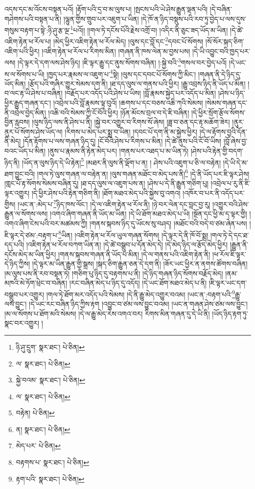 འདས་དང་མ་འོངས་བསྟན་པའོ། །རྟོག་པའི་དྲ་བ་མ་ལུས་པ། །སྤངས་པའི་ཡེ་ཤེས་རྒྱུན་ལྡན་པའི། །དེ་བཞིན་གཤེགས་པའི་བསྟན་པ་ནི། །ལྷུན་གྱིས་གྲུབ་པར་འཇུག་པ་ཡིན། །དེ་ཁོ་ན་ཉིད་བསྡུས་པའི་རབ་ཏུ་བྱེད་པ་ལས་དུས་གསུམ་བརྟག་པ་སྟེ་:ཉི་ཤུ་རྩ་ལྔ་\footnote{ཉི་ཤུ་དྲུག་  སྣར་ཐང་།  པེ་ཅིན། }པའོ།། །།གལ་ཏེ་དངོས་པོའི་རྗེས་འགྲོ་བ། །འདིར་ནི་ཅུང་ཟད་ཡོད་མ་ཡིན། །དེ་ཚེ་འཇིག་རྟེན་ཕ་རོལ་པ། །མེད་ཕྱིར་འཇིག་རྟེན་ཕ་རོལ་མེད། །ལུས་དང་བློ་དང་\footnote{ལ་  སྣར་ཐང་།  པེ་ཅིན། }དབང་པོ་སོགས། །སོ་སོར་སྐད་ཅིག་འཇིག་པའི་ཕྱིར། །འཇིག་རྟེན་ཕ་རོལ་པ་རིགས་མིན། །གཞན་ནི་ཁས་ལེན་མ་བྱས་པས། །དེ་ཡི་འབྱུང་བའི་ཁྱད་པར་ལས། །དེ་ལྟར་དེ་དག་ལས་ཤེས་ཉིད། །ཇི་ལྟར་རྒྱུ་དང་ནུས་སོགས་བཞིན། །:སྐྱེ་བའི་\footnote{སྐྱེ་བའམ་  སྣར་ཐང་།  པེ་ཅིན། }གསལ་བར་བྱེད་པའོ། །དེ་ཡང་ས་ལ་སོགས་པ་ཡི། །ཁྱད་པར་རྣམས་ལ་འཇུག་པ་\footnote{ལ་  སྣར་ཐང་།  པེ་ཅིན། }སྟེ། །ལུས་དང་དབང་པོ་སོགས་ཀྱི་མིང་། །གཞན་ནི་དེ་ཉིད་དུ་ཡོད་མིན། །རྩོད་པའི་གཞིར་གྱུར་སེམས་དག་ནི། །ཐ་དད་ལུས་ལ་གནས་པའི་ཕྱིར། །རྒྱུ་འབྲས་ཉིད་ནི་ཡོད་པ་མིན། །བ་ལང་རྟ་ཡི་ཤེས་པ་བཞིན། །བརྗོད་པར་འདོད་པའི་ཤེས་པ་ཡིས། །བློ་རྣམས་སྐྱེད་པར་འདོད་པ་མིན། །ཤེས་པ་ཉིད་ཕྱིར་རྒྱུད་གཞན་དང་། །འབྲེལ་པའི་བློ་རྣམས་ལྟ་བུའོ། །ཆགས་པ་དང་བཅས་འཆི་ཀའི་སེམས། །སེམས་གཞན་དང་ནི་འབྲེལ་བྱེད་མིན། །འཆི་བའི་སེམས་ཀྱི་ངོ་བོའི་ཕྱིར། །ཉོན་མོངས་བྲལ་བ་དེ་ཇི་བཞིན། །དེ་ཕྱིར་སྲོག་རྩོལ་སོགས་བྱིན་རླབས། །ལུས་ཉིད་ལས་ནི་ཤེས་པ་ནི། །སྐྱེ་བར་འགྱུར་བ་རིགས་སོ་ཞེས། །ཟླ་བ་ཅན་དང་རྟ་མཆོག་ཟེར། །ནུར་ནུར་པོ་སོགས་ཤེས་ཡོད་ལ། །རིགས་པ་མེད་པར་སྨྲ་བ་ཡིན། །དབང་པོ་དག་ནི་མ་སྐྱེས་ཕྱིར། །དེ་ལ་རྟོགས་བྱའི་དོན་ནི་མེད། །དོན་རྟོགས་པ་ལས་གཞན་ཉིད་དུ། །ངོ་བོའི་ཤེས་པ་རིགས་པ་མིན། །དེ་ཚེ་ནུས་པའི་ངོ་བོ་ཡིས། །བློ་ཞེས་བྱ་བའང་ཡོད་པ་མིན། །ནུས་པ་རྣམས་ནི་རྟེན་མེད་པར། །གནས་པར་འཐད་པ་མ་ཡིན་ཏེ། །ཤེས་པའི་རྟེན་གྱི་བདག་ཉིད་ནི། །ཡོད་ན་ལུས་ཉིད་དེ་ཡི་རྟེན།\footnote{བརྟེན།  པེ་ཅིན། } །མཐར་ནི་ལུས་ནི་ལྡོག་པ་ན། །
ཤེས་པའི་འཇུག་པ་ཅི་ལ་བརྟེན། །དེ་ཡི་དེ་མ་ཐག་བྱུང་བའི། །གལ་ཏེ་ལུས་གཞན་ལ་བརྟེན་ན། །ལུས་གཞན་མཐོང་བ་མེད་པས་ནི།\footnote{ན།  སྣར་ཐང་།  པེ་ཅིན། } །དེ་ནི་ཡོད་པར་ཇི་ལྟར་ཤེས། །གླང་པོ་རྟ་སོགས་སེམས་བཞིན་དུ། །ཐ་དད་ལུས་ལ་འཇུག་པས་ན། །ཤེས་པ་དེ་ནི་རྒྱུན་གཅིག་པུ། །འབྲེལ་པ་རུ་ནི་ཇི་ལྟར་འགྱུར། །དེ་ཕྱིར་ཤེས་པའི་རྟེན་གཅིག་ནི། །ཐོག་མཐའ་མེད་པའི་སྐྱེས་བུ་འགའ། །འཁོར་བ་པར་ནི་འདོད་པར་གྱིས། །ཡང་ན་:མེད་པ་\footnote{མེད་པར་  པེ་ཅིན། }ཉིད་ཁས་ལོང་། །དེ་ལ་འཇིག་རྟེན་ཕ་རོལ་ནི། །ཉེ་བར་ལེན་དང་བླང་བྱ་རུ། །འགྱུར་བའི་ཤེས་རྒྱུན་ལ་སོགས་ལས། །འགའ་ཞིག་གཞན་ནི་ཡོད་མ་ཡིན། །དེ་ཡི་ཐོག་མཐའ་མེད་པ་ཡི། །སྔོན་དང་ཕྱི་མ་ད་ལྟར་གྱི། །འགའ་ཞིག་ངེས་པའི་བར་མཚམས་ཀྱི། །གནས་སྐབས་ཉིད་དུ་ཡོངས་སུ་བཤད། །མཐོང་བའི་བདེ་བ་ཙམ་ཞེན་པས། །ཇི་ལྟར་དེ་ཙམ་:བརྟག་པ་\footnote{བརྟགས་པ་  སྣར་ཐང་།  པེ་ཅིན། }ཡིན། །འཇིག་རྟེན་ཕ་རོལ་ཡུལ་གཞན་སོགས། །དེ་ལྟར་དེ་ནི་ཁོ་བོ་སྨྲ། །གལ་ཏེ་དེ་དང་ཐ་དད་པའི། །འཇིག་རྟེན་ཕ་རོལ་བཀག་ཡིན་ན། །དེ་ཚེ་བསྒྲུབ་པ་དོན་མེད་དེ། །དེ་མེད་ཉིད་ལ་རྩོད་མེད་ཕྱིར། །རྒྱུན་ནི་དངོས་མེད་མ་ཡིན་ཕྱིར། །གནས་སྐབས་གཞན་ནི་ཡོད་པ་མིན། །དེ་ལ་གནས་པའི་འཇིག་རྟེན་ནི། །ཕ་རོལ་ཇི་ལྟར་དེ་ཉིད་ཀྱིས། །དེ་ལྟར་མ་ཡིན་རྒྱུན་གྱི་སྒྲས། །སྐད་ཅིག་རྒྱུན་ཅན་དེ་དག་ནི། །ཟོར་ཡང་ཕྱིར་ན་ནགས་ཚོགས་བཞིན། །མ་ལུས་པས་ནི་རབ་བསྟན་ཏེ། །གཅིག་པུ་ཉིད་དུ་བརྟགས་པ་ནི། །དེ་ཉིད་གཞན་ཉིད་སོགས་བརྗོད་མེད། །ནམ་མཁའི་མེ་ཏོག་ཕྲེང་བ་བཞིན། །རང་བཞིན་མེད་པ་ཉིད་དུ་འདོད། །དེ་ཡང་ཐོག་མཐའ་མེད་པ་ནི། །ཇི་ལྟར་ཡང་དག་བསྒྲུབ་པར་འགྱུར། །གལ་ཏེ་ཐོག་མར་འདོད་པའི་སེམས། །དེ་ནི་རྒྱུ་མེད་འགྱུར་བའམ། །ཡང་ན་:བརྟག་པའི་\footnote{རྟག་པའི་  སྣར་ཐང་།  པེ་ཅིན། }རྒྱུ་ལས་བྱུང་། །དེ་ཡང་རང་བཞིན་ཉིད་ཀྱིས་རྟག །འབྱུང་བ་ཙམ་ལས་བྱུང་བའམ། །ཡང་ན་གཞན་ཤེས་ཙམ་ལས་བྱུང་། །མ་ལ་སོགས་པ་ཐོག་མའི་སེམས། །དེ་ལ་རྒྱུ་མེད་རེས་འགའ་བར། རིགས་མིན་གཞན་དུ་དེ་ཡི་ནི། །ཡོད་ཉིད་རྟག་ཏུ་སྣང་བར་འགྱུར། །
